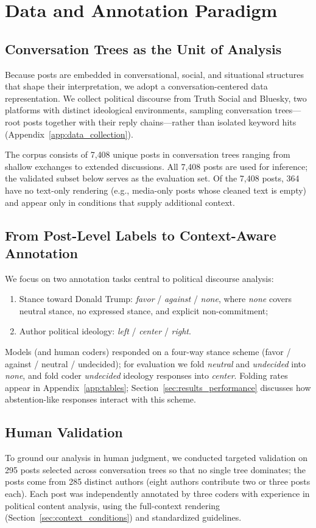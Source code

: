\documentclass[11pt]{article}
\begin{document}
\section{Data and Annotation Paradigm}

\subsection{Conversation Trees as the Unit of Analysis}
Because posts are embedded in conversational, social, and situational structures that shape their interpretation, we adopt a conversation-centered data representation. We collect political discourse from Truth Social and Bluesky, two platforms with distinct ideological environments, sampling conversation trees---root posts together with their reply chains---rather than isolated keyword hits (Appendix~\ref{app:data_collection}).

The corpus consists of 7{,}408 unique posts in conversation trees ranging from shallow exchanges to extended discussions. All 7{,}408 posts are used for inference; the validated subset below serves as the evaluation set. Of the 7{,}408 posts, 364 have no text-only rendering (e.g., media-only posts whose cleaned text is empty) and appear only in conditions that supply additional context.

\subsection{From Post-Level Labels to Context-Aware Annotation}
We focus on two annotation tasks central to political discourse analysis:
\begin{enumerate}
    \item Stance toward Donald Trump: \emph{favor} / \emph{against} / \emph{none}, where \emph{none} covers neutral stance, no expressed stance, and explicit non-commitment;
    \item Author political ideology: \emph{left} / \emph{center} / \emph{right}.
\end{enumerate}
Models (and human coders) responded on a four-way stance scheme (favor / against / neutral / undecided); for evaluation we fold \emph{neutral} and \emph{undecided} into \emph{none}, and fold coder \emph{undecided} ideology responses into \emph{center}. Folding rates appear in Appendix~\ref{app:tables}; Section~\ref{sec:results_performance} discusses how abstention-like responses interact with this scheme.

\subsection{Human Validation}
\label{sec:human_validation}
To ground our analysis in human judgment, we conducted targeted validation on 295 posts selected across conversation trees so that no single tree dominates; the posts come from 285 distinct authors (eight authors contribute two or three posts each). Each post was independently annotated by three coders with experience in political content analysis, using the full-context rendering (Section~\ref{sec:context_conditions}) and standardized guidelines.
\end{document}
